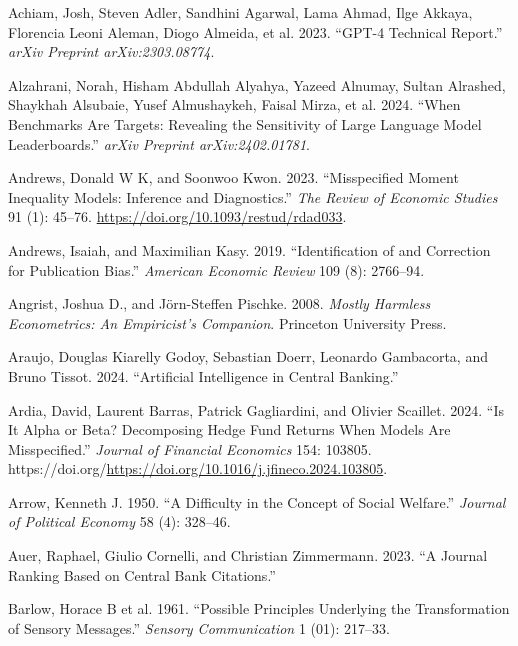 \documentclass[
]{article}
\newlength{\cslhangindent}
\newenvironment{CSLReferences}[2] %
 {\begin{list}{}{%
  \setlength{\itemindent}{0pt}
  \setlength{\leftmargin}{0pt}
  \setlength{\parsep}{0pt}
  \ifodd #1
   \setlength{\leftmargin}{\cslhangindent}
   \setlength{\itemindent}{-1\cslhangindent}
  \fi
  \setlength{\itemsep}{#2\baselineskip}}}
 {\end{list}}
\begin{document}
\label{refs}
\begin{CSLReferences}{1}{0}
Achiam, Josh, Steven Adler, Sandhini Agarwal, Lama Ahmad, Ilge Akkaya,
Florencia Leoni Aleman, Diogo Almeida, et al. 2023. {``GPT-4 Technical
Report.''} \emph{arXiv Preprint arXiv:2303.08774}.

Alzahrani, Norah, Hisham Abdullah Alyahya, Yazeed Alnumay, Sultan
Alrashed, Shaykhah Alsubaie, Yusef Almushaykeh, Faisal Mirza, et al.
2024. {``When Benchmarks Are Targets: Revealing the Sensitivity of Large
Language Model Leaderboards.''} \emph{arXiv Preprint arXiv:2402.01781}.

Andrews, Donald W K, and Soonwoo Kwon. 2023. {``{Misspecified Moment
Inequality Models: Inference and Diagnostics}.''} \emph{The Review of
Economic Studies} 91 (1): 45--76.
\url{https://doi.org/10.1093/restud/rdad033}.

Andrews, Isaiah, and Maximilian Kasy. 2019. {``Identification of and
Correction for Publication Bias.''} \emph{American Economic Review} 109
(8): 2766--94.

Angrist, Joshua D., and Jörn-Steffen Pischke. 2008. \emph{Mostly
Harmless Econometrics: An Empiricist's Companion}. Princeton University
Press.

Araujo, Douglas Kiarelly Godoy, Sebastian Doerr, Leonardo Gambacorta,
and Bruno Tissot. 2024. {``Artificial Intelligence in Central
Banking.''}

Ardia, David, Laurent Barras, Patrick Gagliardini, and Olivier Scaillet.
2024. {``Is It Alpha or Beta? Decomposing Hedge Fund Returns When Models
Are Misspecified.''} \emph{Journal of Financial Economics} 154: 103805.
https://doi.org/\url{https://doi.org/10.1016/j.jfineco.2024.103805}.

Arrow, Kenneth J. 1950. {``A Difficulty in the Concept of Social
Welfare.''} \emph{Journal of Political Economy} 58 (4): 328--46.

Auer, Raphael, Giulio Cornelli, and Christian Zimmermann. 2023. {``A
Journal Ranking Based on Central Bank Citations.''}

Barlow, Horace B et al. 1961. {``Possible Principles Underlying the
Transformation of Sensory Messages.''} \emph{Sensory Communication} 1
(01): 217--33.


\end{CSLReferences}
\end{document}
